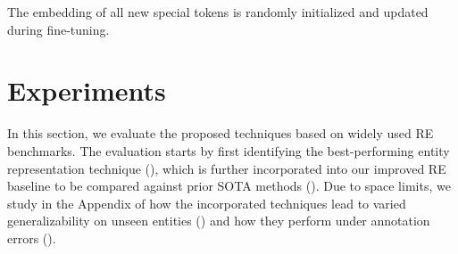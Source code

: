 \documentclass[11pt,a4paper]{article}
\begin{document}
The embedding of all new special tokens is randomly initialized and updated during fine-tuning.

\section{Experiments}

\begin{table*}[!t]
\centering
{}
    \caption{Test  (in \%) of different entity representation techniques on TACRED. For each technique, we also provide the processed input of an example text \textit{``Bill was born in Seattle''}. Typed entity markers (original and punct) significantly outperforms others.}
    \label{tab::representation}
\end{table*}

In this section, we evaluate the proposed techniques based on widely used RE benchmarks. The evaluation starts by first identifying the best-performing entity representation technique (), which is further incorporated into our improved RE baseline to be compared against prior SOTA methods ().
Due to space limits, we study in the Appendix of how the incorporated techniques lead to varied generalizability on unseen entities () and how they perform under annotation errors ().
\end{document}
